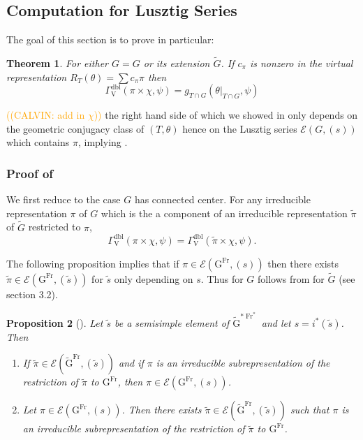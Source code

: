 \documentclass[12pt, reqno]{amsart}
\newtheorem{theorem}{Theorem}[section]
\newtheorem{proposition}[theorem]{Proposition}
\theoremstyle{definition}
\theoremstyle{definition}
\theoremstyle{definition}
\newcommand{\hermitianSpace}{\mathrm{V}}
\newcommand{\fieldCharacter}{\psi}
\newcommand{\GroupExtension}[1]{\widetilde{#1}}
\newcommand{\Frobenius}{\operatorname{Fr}}
\newcommand{\dblGammaFactorSpace}[4]{\Gamma^{\mathrm{dbl}}_{#1}\left(#2 \times #3, #4\right)}
\newcommand{\algebraicGroup}[1]{\boldsymbol{\mathrm{#1}}}
\newcommand{\LusztigSeries}[2]{\mathcal{E}\left(#1, (#2)\right)}
\newcommand{\DualFrobeniusFixedPoints}[2][\Frobenius^{\ast}]{\algebraicGroup{#2}^{\ast #1}}
\newcommand{\FrobeniusFixedPoints}[2][\Frobenius]{\algebraicGroup{#2}^{#1}}
\newcommand{\calvin}[1]{\textcolor{orange}{\sffamily ((CALVIN: #1))}}
\begin{document}
\subsection{Computation for Lusztig Series}
The goal of this section is to prove  in particular:
\begin{theorem}
\label{thm:doubling-method-gamma-factor-for-deligne-lusztig} For either $G=G$ or its extension $\GroupExtension{G}$. If $c_{\pi}$ is nonzero in the virtual representation $R_T(\theta) = \sum c_{\pi} \pi$ then
$$\dblGammaFactorSpace{\hermitianSpace}{\pi}{\chi}{\fieldCharacter} = g_{T \cap G}\left(\theta|_{T \cap G}, \fieldCharacter\right)$$
\end{theorem}
\calvin{add in $\chi$} the right hand side of which we showed in  only depends on the geometric conjugacy class of $(T,\theta)$ hence on the Lusztig series $\LusztigSeries{G}{s}$ which contains $\pi$, implying .
\subsubsection{Proof of }
We first reduce  to the case $G$ has connected center. For any irreducible representation $\pi$ of $G$ which is the a component of an irreducible representation $\tilde{\pi}$ of $\GroupExtension{G}$ restricted to $\pi$,
\[
    \dblGammaFactorSpace{\hermitianSpace}{\pi}{\chi}{\fieldCharacter} = \dblGammaFactorSpace{\hermitianSpace}{\tilde{\pi}}{\chi}{\fieldCharacter}.
\]

The following proposition implies that if $\pi \in \LusztigSeries{\FrobeniusFixedPoints{G}}{s}$ then there exists $\tilde{\pi} \in \LusztigSeries{\FrobeniusFixedPoints{G}}{\tilde{s}}$ for $\tilde{s}$ only depending on $s$. Thus  for $G$ follows from  for $\GroupExtension{G}$ (see section 3.2). 

\begin{proposition}[{\cite[Proposition 11.7]{Bonnafe2006}}]
	Let $\tilde{s}$ be a semisimple element of $\DualFrobeniusFixedPoints{\GroupExtension{G}}$ and let $s = i^{\ast}\left(\tilde{s}\right)$. Then
	\begin{enumerate}
		\item If $\tilde{\pi} \in \LusztigSeries{\FrobeniusFixedPoints{\GroupExtension{G}}}{\tilde{s}}$ and if $\pi$ is an irreducible subrepresentation of the restriction of $\tilde{\pi}$ to $\FrobeniusFixedPoints{G}$, then $\pi \in \LusztigSeries{\FrobeniusFixedPoints{G}}{s}$.
		\item Let $\pi \in \LusztigSeries{\FrobeniusFixedPoints{G}}{s}$. Then there exists $\tilde{\pi} \in \LusztigSeries{\FrobeniusFixedPoints{\GroupExtension{G}}}{\tilde{s}}$ such that $\pi$ is an irreducible subrepresentation of the restriction of $\tilde{\pi}$ to $\FrobeniusFixedPoints{G}$.
	\end{enumerate}
\end{proposition}
\end{document}
